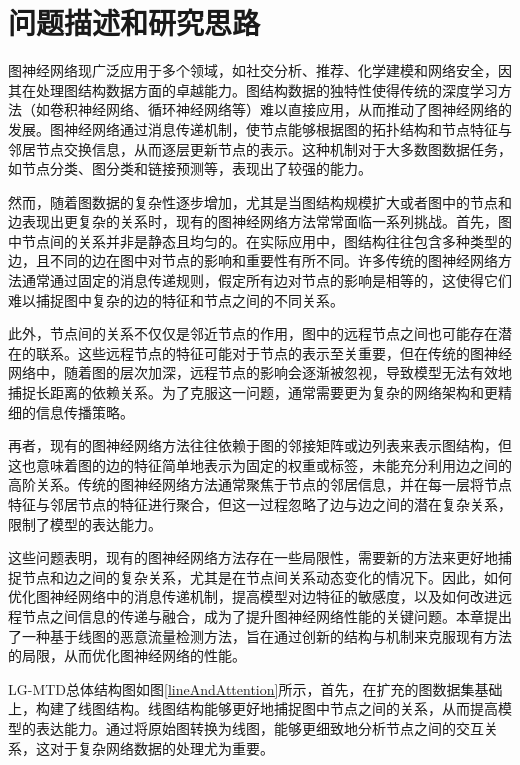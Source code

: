 \documentclass[promaster]{thesis-uestc}
\begin{document}
\section{问题描述和研究思路}
图神经网络现广泛应用于多个领域，如社交分析、推荐、化学建模和网络安全，因其在处理图结构数据方面的卓越能力。图结构数据的独特性使得传统的深度学习方法（如卷积神经网络、循环神经网络等）难以直接应用，从而推动了图神经网络的发展。图神经网络通过消息传递机制，使节点能够根据图的拓扑结构和节点特征与邻居节点交换信息，从而逐层更新节点的表示。这种机制对于大多数图数据任务，如节点分类、图分类和链接预测等，表现出了较强的能力。

然而，随着图数据的复杂性逐步增加，尤其是当图结构规模扩大或者图中的节点和边表现出更复杂的关系时，现有的图神经网络方法常常面临一系列挑战。首先，图中节点间的关系并非是静态且均匀的。在实际应用中，图结构往往包含多种类型的边，且不同的边在图中对节点的影响和重要性有所不同。许多传统的图神经网络方法通常通过固定的消息传递规则，假定所有边对节点的影响是相等的，这使得它们难以捕捉图中复杂的边的特征和节点之间的不同关系。

此外，节点间的关系不仅仅是邻近节点的作用，图中的远程节点之间也可能存在潜在的联系。这些远程节点的特征可能对于节点的表示至关重要，但在传统的图神经网络中，随着图的层次加深，远程节点的影响会逐渐被忽视，导致模型无法有效地捕捉长距离的依赖关系。为了克服这一问题，通常需要更为复杂的网络架构和更精细的信息传播策略。

再者，现有的图神经网络方法往往依赖于图的邻接矩阵或边列表来表示图结构，但这也意味着图的边的特征简单地表示为固定的权重或标签，未能充分利用边之间的高阶关系。传统的图神经网络方法通常聚焦于节点的邻居信息，并在每一层将节点特征与邻居节点的特征进行聚合，但这一过程忽略了边与边之间的潜在复杂关系，限制了模型的表达能力。

这些问题表明，现有的图神经网络方法存在一些局限性，需要新的方法来更好地捕捉节点和边之间的复杂关系，尤其是在节点间关系动态变化的情况下。因此，如何优化图神经网络中的消息传递机制，提高模型对边特征的敏感度，以及如何改进远程节点之间信息的传递与融合，成为了提升图神经网络性能的关键问题。本章提出了一种基于线图的恶意流量检测方法，旨在通过创新的结构与机制来克服现有方法的局限，从而优化图神经网络的性能。


LG-MTD总体结构图如图\ref{lineAndAttention}所示，首先，在扩充的图数据集基础上，构建了线图结构。线图结构能够更好地捕捉图中节点之间的关系，从而提高模型的表达能力。通过将原始图转换为线图，能够更细致地分析节点之间的交互关系，这对于复杂网络数据的处理尤为重要。
\end{document}
